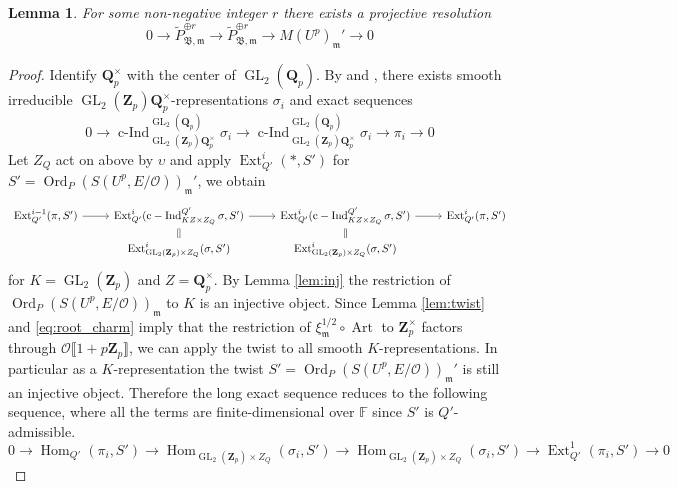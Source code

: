 \documentclass[leqno]{amsart}
\newtheorem{lem}[thm]{Lemma}
\theoremstyle{definition}
\theoremstyle{remark}
\newcommand{\oo}{\mathcal{O}}
\newcommand{\fF}{\mathbb{F}} %
\newcommand{\Qp}{\mathbf{Q}_p}
\newcommand{\Zp}{\mathbf{Z}_p}
\DeclareMathOperator{\Hom}{Hom}
\DeclareMathOperator{\Ext}{Ext}
\DeclareMathOperator{\cInd}{c-Ind}
\DeclareMathOperator{\GL}{GL}
\DeclareMathOperator{\Art}{Art}
\newcommand{\fm}{\mathfrak{m}}
\DeclareMathOperator{\Ord}{Ord} %
\newcommand{\B}{\mathfrak B} %
\begin{document}
\begin{lem}
	For some non-negative integer $r$
	there exists a projective resolution 
	\begin{equation}\label{eq:resolution}
	0\to \tilde{P}_{\B,\fm}^{\oplus r}\to 
	\tilde{P}_{\B,\fm}^{\oplus r}\to 
	M(U^p)_{\fm}'\to 0
	\end{equation}
\end{lem}
\begin{proof}
Identify $\Qp^\times$ with the center of $\GL_2(\Qp)$.
By \cite[Thm 33]{barthel} and \cite[Thm 19]{barthel}, 
there exists
smooth irreducible 
$\GL_2(\Zp)\Qp^\times$-representations $\sigma_i$
and exact sequences
\begin{equation}
	0\to 
	\cInd_{\GL_2(\Zp)\Qp^\times}^{\GL_2(\Qp)}\sigma_i\to
	\cInd_{\GL_2(\Zp)\Qp^\times}^{\GL_2(\Qp)}\sigma_i\to
	\pi_i\to 0
\end{equation}
Let $Z_Q$ act on above by $\upsilon$
and apply $\Ext^i_{Q'}(*,S')$
for $S'=\Ord_P(S(U^p,E/\oo))_{\fm}'$,
we obtain
\begin{equation*}
    \begin{tikzcd}[row sep=2ex]
	    \Ext^{i-1}_{Q'}
	    (\pi, S')\arrow[r] &
	    \Ext^{i}_{Q'}
        (\cInd_{KZ\times Z_Q}^{Q'}\sigma, S')
	    \arrow[r] \arrow[d,equal] &
	    \Ext^{i}_{Q'}
        (\cInd_{KZ\times Z_Q}^{Q'}\sigma, S')
	    \arrow[r] \arrow[d,equal] &
	    \Ext^{i}_{Q'}(\pi, S')\\ 
	 & \Ext^i_{\GL_2(\Zp)\times Z_Q}(\sigma ,S') &
	    \Ext^i_{\GL_2(\Zp)\times Z_Q}(\sigma ,S') &
    \end{tikzcd}
\end{equation*}
for $K=\GL_2(\Zp)$ and $Z=\Qp^\times$.
By Lemma \ref{lem:inj}
the restriction of $\Ord_P(S(U^p,E/\oo))_\fm$ to $K$
is an injective object.
Since Lemma \ref{lem:twist} and \eqref{eq:root_charm} imply that 
the restriction of $\xi_{\fm}^{1/2}\circ \Art$ to $\Zp^\times$
factors through  $\oo\llbracket 1+p\Zp\rrbracket$,
we can apply the twist to all smooth $K$-representations.
In particular as a $K$-representation
the twist $S'=\Ord_P(S(U^p,E/\oo))_\fm'$
is still an injective object.
Therefore the long exact sequence reduces to 
the following sequence, where
all the terms are finite-dimensional over $\fF$
since $S'$ is $Q'$-admissible.
\begin{equation*}
	0 \to \Hom_{Q'}(\pi_i,S')\to 
	\Hom_{\GL_2(\Zp)\times Z_Q}(\sigma_i,S')\to 
	\Hom_{\GL_2(\Zp)\times Z_Q}(\sigma_i,S')\to 
	\Ext^1_{Q'}(\pi_i,S')\to 0
\end{equation*}




\end{proof}
\end{document}
